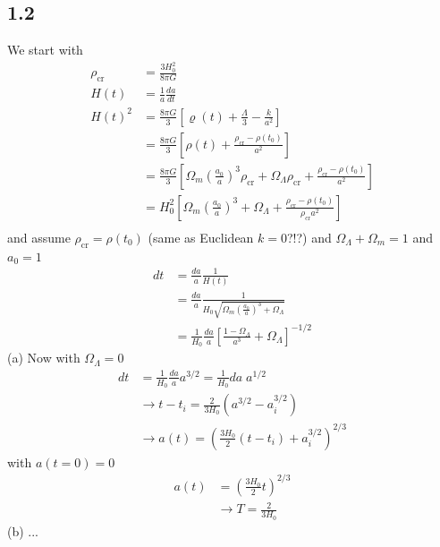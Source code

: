 \documentclass[10pt,a4paper]{book}
\theoremstyle{definition}
\begin{document}
\subsection{1.2}
We start with 
\begin{align}
\rho_\text{cr}&=\frac{3H_0^2}{8\pi G}\\
H(t)&=\frac{1}{a}\frac{da}{dt}\\
H(t)^2
&=\frac{8\pi G}{3}\left[\varrho(t)+\frac{\Lambda}{3}-\frac{k}{a^2}\right]\\
&=\frac{8\pi G}{3}\left[\rho(t)+\frac{\rho_\text{cr}-\rho(t_0)}{a^2}\right]\\
&=\frac{8\pi G}{3}\left[\Omega_m\left(\frac{a_0}{a}\right)^3\rho_\text{cr}+\Omega_\Lambda\rho_\text{cr}+\frac{\rho_\text{cr}-\rho(t_0)}{a^2}\right]\\
&=H_0^2\left[\Omega_m\left(\frac{a_0}{a}\right)^3+\Omega_\Lambda+\frac{\rho_\text{cr}-\rho(t_0)}{\rho_\text{cr}a^2}\right]\\
\end{align}
and assume $\rho_\text{cr}=\rho(t_0)$ (same as Euclidean $k=0$?!?) and $\Omega_\Lambda+\Omega_m=1$ and $a_0=1$
\begin{align}
dt&=\frac{da}{a}\frac{1}{H(t)}\\
&=\frac{da}{a}\frac{1}{H_0\sqrt{\Omega_m\left(\frac{a_0}{a}\right)^3+\Omega_\Lambda}}\\
&=\frac{1}{H_0}\frac{da}{a}\left[\frac{1-\Omega_\Lambda}{a^3}+\Omega_\Lambda\right]^{-1/2}
\end{align}
(a) Now with $\Omega_\Lambda=0$
\begin{align}
dt&=\frac{1}{H_0}\frac{da}{a}a^{3/2}=\frac{1}{H_0}da\;a^{1/2}\\
&\rightarrow t-t_i=\frac{2}{3H_0}(a^{3/2}-a_i^{3/2})\\
&\rightarrow a(t)=\left(\frac{3H_0}{2}(t-t_i)+a_i^{3/2}\right)^{2/3}
\end{align}
with $a(t=0)=0$
\begin{align}
a(t)&=\left(\frac{3H_0}{2}t\right)^{2/3}\\
&\rightarrow T=\frac{2}{3H_0}
\end{align}
(b) ...
\end{document}
